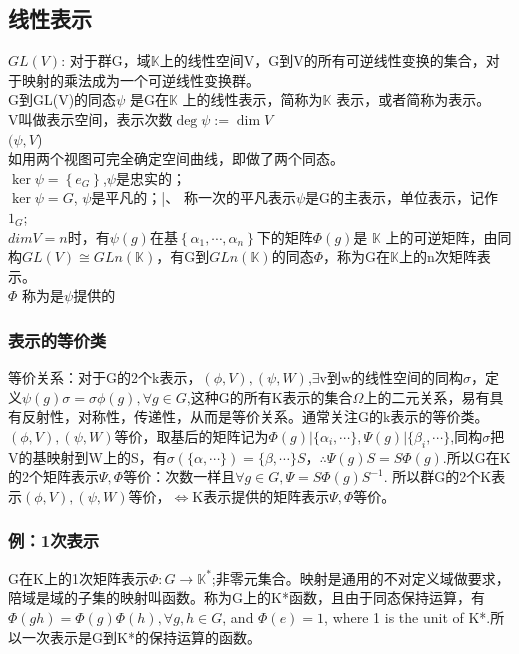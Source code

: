 \subsection{线性表示}
$GL(V)$: 对于群G，域$\mathbb K$上的线性空间V，G到V的所有可逆线性变换的集合，对于映射的乘法成为一个可逆线性变换群。\\
G到GL(V)的同态$\psi $ 是G在$\mathbb K$ 上的线性表示，简称为$\mathbb K$ 表示，或者简称为表示。\\
V叫做表示空间，表示次数$\deg \psi := \dim V$\\
$(\psi ,V$)\\
如用两个视图可完全确定空间曲线，即做了两个同态。\\
$\ker \psi =\left\{ e_G \right\}$,$\psi $是忠实的；\\
$\ker \psi =G$, $\psi$是平凡的；|、
称一次的平凡表示$\psi $是G的主表示，单位表示，记作$1_G$;\\
$dimV=n$时，有$\psi (g)$在基$\left\{ \alpha_1,\cdots , \alpha_n \right\}$下的矩阵$\Phi(g)$是 $\mathbb K$ 上的可逆矩阵，由同构$GL(V) \cong GLn(\mathbb K)$，有G到$GLn(\mathbb K)$的同态$\Phi$，称为G在$\mathbb K$上的n次矩阵表示。\\
$\Phi $ 称为是$\psi $提供的

\subsubsection{表示的等价类}
等价关系：对于G的2个k表示，$(\phi,V),(\psi,W)$,$\exists$v到w的线性空间的同构$\sigma$，定义$\psi(g)\sigma =\sigma \phi (g), \forall g \in G$,这种G的所有K表示的集合$\Omega$上的二元关系，易有具有反射性，对称性，传递性，从而是等价关系。通常关注G的k表示的等价类。\\
$(\phi,V),(\psi,W)$等价，取基后的矩阵记为$\Phi (g)| \{\alpha _i, \cdots\},\Psi (g)| \{\beta _i, \cdots\}$,同构$\sigma$把V的基映射到W上的S，有$\sigma (\{\alpha , \cdots\})=\{\beta, \cdots\}S$，$\therefore \Psi (g)S=S\Phi(g)$.所以G在K的2个矩阵表示$\Psi, \Phi$等价：次数一样且$\forall g \in G,\Psi =S\Phi (g)S^{-1}$. 所以群G的2个K表示$(\phi,V),(\psi,W)$等价，$\Leftrightarrow$K表示提供的矩阵表示$\Psi, \Phi$等价。
\subsubsection{例：1次表示}
G在K上的1次矩阵表示$\Phi: G \to \mathbb K^*$;非零元集合。映射是通用的不对定义域做要求，陪域是域的子集的映射叫函数。称为G上的K*函数，且由于同态保持运算，有$\Phi (gh)=\Phi (g)\Phi(h), \forall g,h \in G$, and $\Phi(e)=1$, where 1 is the unit of K*.所以一次表示是G到K*的保持运算的函数。


